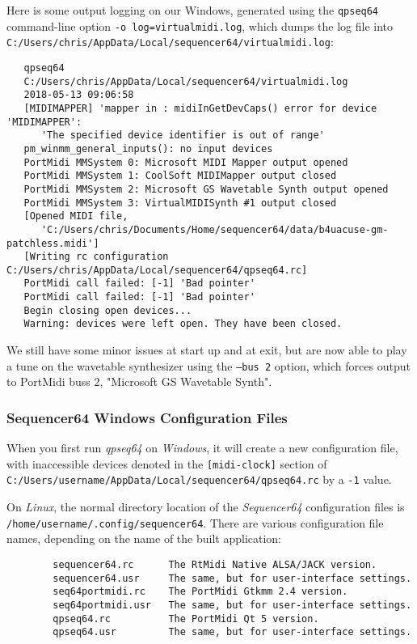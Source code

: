     Here is some output logging on our Windows, generated using the
    \texttt{qpseq64} command-line option
    \texttt{-o log=virtualmidi.log},
    which dumps the log file into
    \texttt{C:/Users/chris/AppData/Local/sequencer64/virtualmidi.log}:

\begin{verbatim}
   qpseq64 
   C:/Users/chris/AppData/Local/sequencer64/virtualmidi.log 
   2018-05-13 09:06:58 
   [MIDIMAPPER] 'mapper in : midiInGetDevCaps() error for device 'MIDIMAPPER':
      'The specified device identifier is out of range'
   pm_winmm_general_inputs(): no input devices
   PortMidi MMSystem 0: Microsoft MIDI Mapper output opened
   PortMidi MMSystem 1: CoolSoft MIDIMapper output closed
   PortMidi MMSystem 2: Microsoft GS Wavetable Synth output opened
   PortMidi MMSystem 3: VirtualMIDISynth #1 output closed
   [Opened MIDI file,
      'C:/Users/chris/Documents/Home/sequencer64/data/b4uacuse-gm-patchless.midi']
   [Writing rc configuration C:/Users/chris/AppData/Local/sequencer64/qpseq64.rc]
   PortMidi call failed: [-1] 'Bad pointer'
   PortMidi call failed: [-1] 'Bad pointer'
   Begin closing open devices...
   Warning: devices were left open. They have been closed.
\end{verbatim}

    We still have some minor issues at start up and at exit, but are now able
    to play a tune on the wavetable synthesizer using the
    \texttt{--bus 2} option, which forces output to PortMidi buss 2,
    "Microsoft GS Wavetable Synth".

\subsubsection{Sequencer64 Windows Configuration Files}
\label{subsubsec:qt_portmidi_windows_setup_config}

    When you first run \textsl{qpseq64}
    on \textsl{Windows}, it will create a new configuration
    file, with inaccessible devices denoted in the
    \texttt{[midi-clock]} section of
    \texttt{C:/Users/username/AppData/Local/sequencer64/qpseq64.rc}
    by a \texttt{-1} value.

    On \textsl{Linux},
    the normal directory location of the \textsl{Sequencer64} configuration
    files is
    \texttt{/home/username/.config/sequencer64}.  There are various
    configuration file names, depending on the name of the built application:

\begin{verbatim}
        sequencer64.rc      The RtMidi Native ALSA/JACK version.
        sequencer64.usr     The same, but for user-interface settings.
        seq64portmidi.rc    The PortMidi Gtkmm 2.4 version.
        seq64portmidi.usr   The same, but for user-interface settings.
        qpseq64.rc          The PortMidi Qt 5 version.
        qpseq64.usr         The same, but for user-interface settings.
\end{verbatim}

